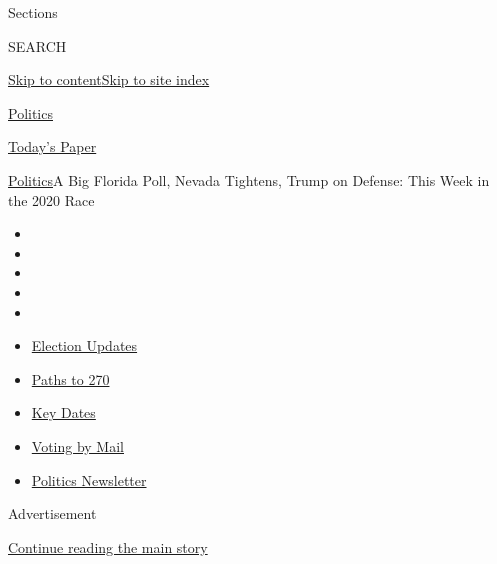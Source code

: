 Sections

SEARCH

\protect\hyperlink{site-content}{Skip to
content}\protect\hyperlink{site-index}{Skip to site index}

\href{https://www.nytimes3xbfgragh.onion/section/politics}{Politics}

\href{https://myaccount.nytimes3xbfgragh.onion/auth/login?response_type=cookie\&client_id=vi}{}

\href{https://www.nytimes3xbfgragh.onion/section/todayspaper}{Today's
Paper}

\href{/section/politics}{Politics}\textbar{}A Big Florida Poll, Nevada
Tightens, Trump on Defense: This Week in the 2020 Race

\begin{itemize}
\item
\item
\item
\item
\item
\end{itemize}

\begin{itemize}
\item
  \href{https://www.nytimes3xbfgragh.onion/live/2020/09/11/us/trump-vs-biden?action=click\&pgtype=Article\&state=default\&region=TOP_BANNER\&context=storylines_menu}{Election
  Updates}
\item
  \href{https://www.nytimes3xbfgragh.onion/interactive/2020/us/elections/election-states-biden-trump.html?action=click\&pgtype=Article\&state=default\&region=TOP_BANNER\&context=storylines_menu}{Paths
  to 270}
\item
  \href{https://www.nytimes3xbfgragh.onion/interactive/2019/us/elections/2020-presidential-election-calendar.html?action=click\&pgtype=Article\&state=default\&region=TOP_BANNER\&context=storylines_menu}{Key
  Dates}
\item
  \href{https://www.nytimes3xbfgragh.onion/interactive/2020/08/31/us/politics/vote-by-mail-deadlines.html?action=click\&pgtype=Article\&state=default\&region=TOP_BANNER\&context=storylines_menu}{Voting
  by Mail}
\item
  \href{https://www.nytimes3xbfgragh.onion/newsletters/politics?action=click\&pgtype=Article\&state=default\&region=TOP_BANNER\&context=storylines_menu}{Politics
  Newsletter}
\end{itemize}

Advertisement

\protect\hyperlink{after-top}{Continue reading the main story}

